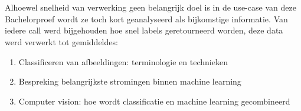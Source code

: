 \section{}
\label{sec:snelheid-per-api}
Alhoewel snelheid van verwerking geen belangrijk doel is in de use-case van deze Bachelorproef wordt ze toch kort geanalyseerd als bijkomstige informatie. 
Van iedere call werd bijgehouden hoe snel labels geretourneerd worden, deze data werd verwerkt tot gemiddeldes:

\begin{enumerate}
    \item Classificeren van afbeeldingen: terminologie en technieken
    \item Bespreking belangrijkste stromingen binnen machine learning
    \item Computer vision: hoe wordt classificatie en machine learning gecombineerd
\end{enumerate}

\section{}
\label{sec:besluit}